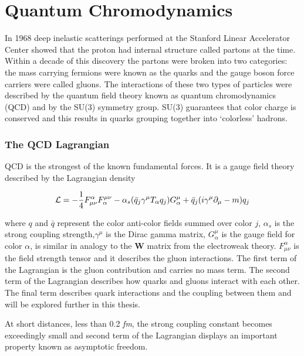 
\chapter{Quantum Chromodynamics} \label{ch:qcd}
In 1968 deep inelastic scatterings performed at the Stanford Linear Accelerator Center showed that the proton had internal structure\cite{Riordan1287} called partons at the time.  Within a decade of this discovery the partons were broken into two categories: the mass carrying fermions were known as the quarks and the gauge boson force carriers were called gluons.  The interactions of these two types of particles were described by the quantum field theory known as quantum chromodynamics (QCD) and by the SU(3) symmetry group.  SU(3) guarantees that color charge is conserved and this results in quarks grouping together into `colorless' hadrons.

\subsection{The QCD Lagrangian}
QCD is the strongest of the known fundamental forces.  It is a gauge field theory described by the Lagrangian density

\begin{equation}
{\cal L}=-\frac{1}{4}F^{\alpha}_{\mu\nu}F^{\mu\nu}_{\alpha}
- \alpha_{s} (\bar{q}_{j}\gamma^{\mu}T_{\alpha}q_{j})G_{\alpha}^{\mu}
+ \bar{q}_{j}(i\gamma^{\mu} \partial_{\mu} - m)q_{j}
\label{eq:lagrangian}
\end{equation}

\noindent
where $q$ and $\bar{q}$ represent the color anti-color fields summed over color $j$, $\alpha_{s}$ is the strong coupling strength,$\gamma^{\mu}$ is the Dirac gamma matrix, $G_{\alpha}^{\mu}$ is the gauge field for color \textit{$\alpha$}, is similar in analogy to the \textbf{W} matrix from the electroweak theory.  $F^{\alpha}_{\mu\nu}$ is the field strength tensor and it describes the gluon interactions. The first term of the Lagrangian is the gluon contribution and carries no mass term.  The second term of the Lagrangian describes how quarks and gluons interact with each other. The final term describes quark interactions and the coupling between them and will be explored further in this thesis.

At short distances, less than 0.2 \textit{fm}, the strong coupling constant becomes exceedingly small and second term of the Lagrangian displays an important property known as asymptotic freedom\cite{Wilczek:2005az}. 

